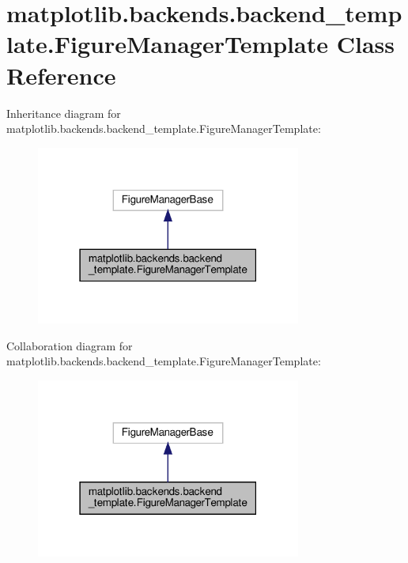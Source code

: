 \hypertarget{classmatplotlib_1_1backends_1_1backend__template_1_1FigureManagerTemplate}{}\section{matplotlib.\+backends.\+backend\+\_\+template.\+Figure\+Manager\+Template Class Reference}
\label{classmatplotlib_1_1backends_1_1backend__template_1_1FigureManagerTemplate}


Inheritance diagram for matplotlib.\+backends.\+backend\+\_\+template.\+Figure\+Manager\+Template\+:
\nopagebreak
\begin{figure}[H]
\begin{center}
\leavevmode
\includegraphics[width=247pt]{classmatplotlib_1_1backends_1_1backend__template_1_1FigureManagerTemplate__inherit__graph}
\end{center}
\end{figure}


Collaboration diagram for matplotlib.\+backends.\+backend\+\_\+template.\+Figure\+Manager\+Template\+:
\nopagebreak
\begin{figure}[H]
\begin{center}
\leavevmode
\includegraphics[width=247pt]{classmatplotlib_1_1backends_1_1backend__template_1_1FigureManagerTemplate__coll__graph}
\end{center}
\end{figure}


